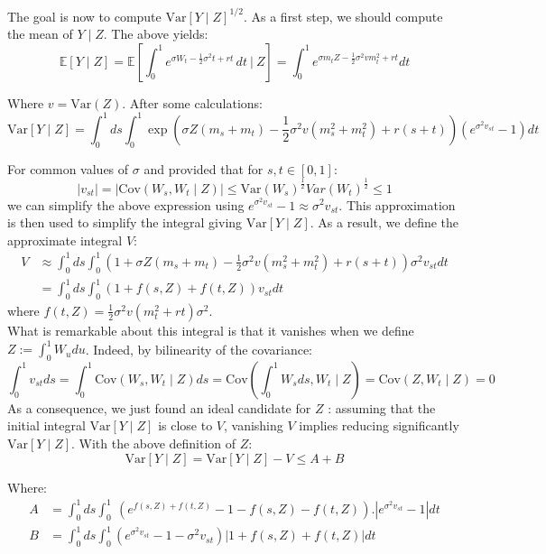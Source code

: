 \documentclass{article}
\begin{document}
The goal is now to compute $\mathrm{Var}[Y\mid Z]^{1/2}$.
As a first step, we should compute the mean of $Y \mid Z$. The above yields:
\begin{equation}
\mathbb{E}[Y\mid Z]=\mathbb{E}\left[\int_{0}^{1} e^{\sigma W_{t}-{\textstyle\frac{1}{2}}\sigma^{2}t+r t}\,dt
\ \Big\vert \ Z \right]=\int_{0}^{1} e^{\sigma m_t Z-{\textstyle\frac{1}{2}}\sigma^{2}v m_{t}^{2}+r t}dt
\tag{V}
\end{equation}

Where $v=\mathrm{Var}(Z)$. After some calculations:
\[
\mathrm{Var}[Y\mid Z]=\int_{0}^{1}d s\int_{0}^{1}\exp(\sigma Z(m_{s}+m_{t})-{\textstyle{\frac{1}{2}}}\sigma^{2}v(m_{s}^{2}+m_{t}^{2})+r(s+t))(e^{\sigma^{2}v_{s t}}-1)d t
\]

For common values of $\sigma$ and provided that for $s,t \in [0,1]$:
\[
	| v_{st} | = | \mathrm{Cov} (W_s,W_t\mid Z)| \leq \mathrm{Var}(W_s)^{\frac{1}{2}} Var(W_t)^{\frac{1}{2}}\leq 1
\]
we can simplify the above expression using $e^{\sigma^{2}v_{s t}}-1\approx \sigma^{2}v_{s t}$.
This approximation is then used to simplify the integral giving $\mathrm{Var}[Y\mid Z]$.
As a result, we define the approximate integral $V$:
\begin{align*}
	V &\approx \int_{0}^{1} ds\int_{0}^{1}(1+\sigma Z(m_{s}+m_{t})-{\textstyle\frac{1}{2}}
	\sigma^{2}v(m_{s}^{2}+m_{t}^{2})	+r(s+t))\sigma^{2}v_{s t}d t \\
	&=\int_{0}^{1}ds\int_{0}^{1} (1+f(s,Z)+f(t,Z))v_{s t}dt
\end{align*}
where $f(t,Z)=\textstyle\frac{1}{2}\sigma^{2}v(m_{t}^{2}+rt)\sigma^{2}$.
\\

What is remarkable about this integral is that it vanishes when we define $Z := \int_{0}^{1}W_u du$.
Indeed, by bilinearity of the covariance:\\
\[
    \int_{0}^{1}v_{st}ds
    =\int_{0}^{1}\mathrm{Cov}(W_s,W_t\mid Z)ds
    =\mathrm{Cov} \left( \int_{0}^{1}W_s ds,W_t\mid Z \right)
    =\mathrm{Cov}(Z,W_t\mid Z)
    =0
\]
As a consequence, we just found an ideal candidate for $Z$ : assuming that the initial integral
$\mathrm{Var}[Y\mid Z]$ is close to $V$, vanishing $V$ implies reducing significantly $\mathrm{Var}[Y\mid Z]$.
With the above definition of $Z$:
\[
  \mathrm{Var}[Y\mid Z]= \mathrm{Var}[Y\mid Z]-V\leq A+B 
\]

Where:
\begin{align*}
    A&=\int_{0}^{1}d s\int_{0}^{1}\ (e^{f(s,Z)+f(t,Z)}-1-f(s,Z)-f(t,Z)).|e^{\sigma^{2}v_{s t}}-1|d t\\
    B&=\int_{0}^{1}d s\int_{0}^{1}(e^{\sigma^{2}v_{s t}}-1-\sigma^{2}v_{s t}) | 1+f(s,Z)+f(t,Z) | dt
\end{align*}
\end{document}
